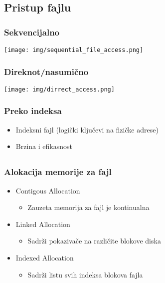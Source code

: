 \documentclass{beamer}
\begin{document}
\subsection*{Pristup fajlu}
\begin{frame}
    \frametitle{Sekvencijalno}
    \begin{center}
        \texttt{[image: img/sequential\_file\_access.png]}
    \end{center}
\end{frame}

\begin{frame}
    \frametitle{Direknot/nasumično}
    \begin{center}
        \texttt{[image: img/dirrect\_access.png]}
    \end{center}
\end{frame}

\begin{frame}
    \frametitle{Preko indeksa}
    \begin{itemize}
        \item Indeksni fajl (logički ključevi na fizičke adrese) \newline
        \item Brzina i efikasnost
    \end{itemize}
\end{frame}


\subsection*{}

\begin{frame}
    \frametitle{Alokacija memorije za fajl}
    \begin{itemize}
        \item Contigous Allocation \begin{itemize}
            \item Zauzeta memorija za fajl je kontinualna \newline
        \end{itemize}
        \item Linked Allocation \begin{itemize}
            \item Sadrži pokazivače na različite blokove diska \newline
        \end{itemize}
        \item Indexed Allocation \begin{itemize}
            \item Sadrži listu svih indeksa blokova fajla
        \end{itemize}
    \end{itemize}
\end{frame}
\end{document}
